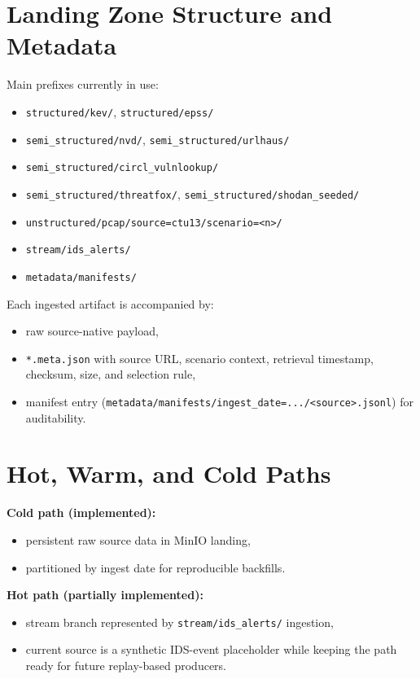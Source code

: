 \documentclass[11pt,a4paper]{article}
\begin{document}
\section{Landing Zone Structure and Metadata}
Main prefixes currently in use:
\begin{itemize}[leftmargin=1.5em]
  \item \texttt{structured/kev/}, \texttt{structured/epss/}
  \item \texttt{semi\_structured/nvd/}, \texttt{semi\_structured/urlhaus/}
  \item \texttt{semi\_structured/circl\_vulnlookup/}
  \item \texttt{semi\_structured/threatfox/}, \texttt{semi\_structured/shodan\_seeded/}
  \item \texttt{unstructured/pcap/source=ctu13/scenario=<n>/}
  \item \texttt{stream/ids\_alerts/}
  \item \texttt{metadata/manifests/}
\end{itemize}

Each ingested artifact is accompanied by:
\begin{itemize}[leftmargin=1.5em]
  \item raw source-native payload,
  \item \texttt{*.meta.json} with source URL, scenario context, retrieval timestamp, checksum, size, and selection rule,
  \item manifest entry (\texttt{metadata/manifests/ingest\_date=.../<source>.jsonl}) for auditability.
\end{itemize}

\section{Hot, Warm, and Cold Paths}
\textbf{Cold path (implemented):}
\begin{itemize}[leftmargin=1.5em]
  \item persistent raw source data in MinIO landing,
  \item partitioned by ingest date for reproducible backfills.
\end{itemize}

\textbf{Hot path (partially implemented):}
\begin{itemize}[leftmargin=1.5em]
  \item stream branch represented by \texttt{stream/ids\_alerts/} ingestion,
  \item current source is a synthetic IDS-event placeholder while keeping the path ready for future replay-based producers.
\end{itemize}
\end{document}
